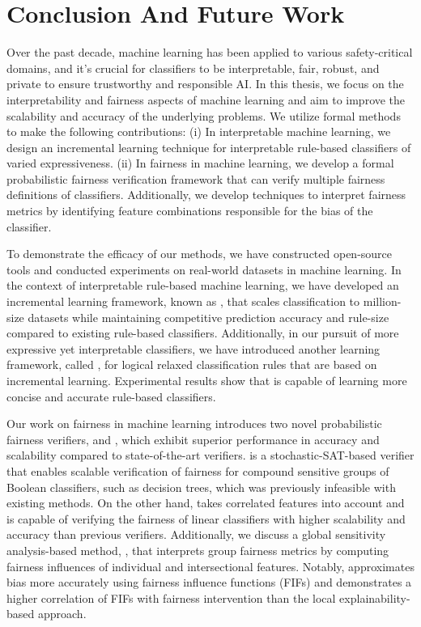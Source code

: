 \chapter{Conclusion And Future Work}
\label{chapter:conclusion} 
Over the past decade, machine learning has been applied to various safety-critical domains, and it's crucial for classifiers to be interpretable, fair, robust, and private to ensure trustworthy and responsible AI. In this thesis, we focus on the interpretability and fairness aspects of machine learning and aim to improve the scalability and accuracy of the underlying problems. We utilize formal methods to make the following contributions: (i) In interpretable machine learning, we design an incremental learning technique for interpretable rule-based classifiers of varied expressiveness. (ii) In fairness in machine learning, we develop a formal probabilistic fairness verification framework that can verify multiple fairness definitions of classifiers.  Additionally, we develop techniques to interpret fairness metrics by identifying feature combinations responsible for the bias of the classifier.



To demonstrate the efficacy of our methods, we have constructed open-source tools and conducted experiments on real-world datasets in machine learning. In the context of interpretable rule-based machine learning, we have developed an incremental learning framework, known as {\imli}, that scales classification to million-size datasets while maintaining competitive prediction accuracy and rule-size compared to existing rule-based classifiers. Additionally, in our pursuit of more expressive yet interpretable classifiers, we have introduced another learning framework, called {\crr}, for logical relaxed classification rules that are based on incremental learning. Experimental results show that {\crr} is capable of learning more concise and accurate rule-based classifiers.


Our work on fairness in machine learning introduces two novel probabilistic fairness verifiers, {\justicia} and {\fvgm}, which exhibit superior performance in accuracy and scalability compared to state-of-the-art verifiers. {\justicia} is a stochastic-SAT-based verifier that enables scalable verification of fairness for compound sensitive groups of Boolean classifiers, such as decision trees, which was previously infeasible with existing methods. On the other hand, {\fvgm} takes correlated features into account and is capable of verifying the fairness of linear classifiers with higher scalability and accuracy than previous verifiers. Additionally, we discuss a global sensitivity analysis-based method, {\fairXplainer}, that interprets group fairness metrics by computing fairness influences of individual and intersectional features. Notably, {\fairXplainer} approximates bias more accurately using fairness influence functions (FIFs) and demonstrates a higher correlation of FIFs with fairness intervention than the local explainability-based approach.


